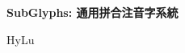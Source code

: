 \documentclass[12pt]{article}
\numberwithin{equation}{section}
\begin{document}

\begin{center}
    {\Huge \textbf{SubGlyphs: 通用拼合注音字系統} \par}
    {\Large HyLu \par}
    \hrulefill
\end{center}






\end{document}
